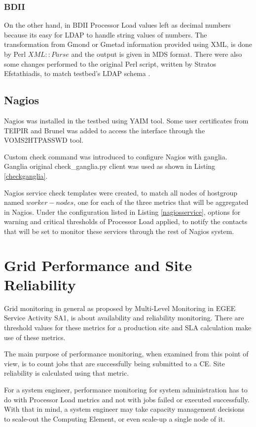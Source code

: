 \subsubsection{BDII}

On the other hand, in BDII Processor Load values left as decimal numbers because its easy for LDAP to handle string values of numbers. The transformation from Gmond or Gmetad information provided using XML, is done by Perl $XML::Parse$ and the output is given in MDS format. There were also some changes performed to the original Perl script, written by Stratos Efstathiadis, to match testbed's LDAP schema \cite{stratos_efstathiadis}.

\subsection{Nagios}

Nagios was installed in the testbed using \ac{YAIM} tool. Some user certificates from \ac{TEIPIR} and Brunel was added to access the interface through the VOMS2HTPASSWD tool.

Custom check command was introduced to configure Nagios with ganglia. Ganglia original check\_ganglia.py client was used as shown in Listing \ref{checkganglia}.

Nagios service check templates were created, to match all nodes of hostgroup named $worker-nodes$, one for each of the three metrics that will be aggregated in Nagios. Under the configuration listed in Listing \ref{nagiosservice}, options for warning and critical thresholds of Processor Load applied, to notify the contacts that will be set to monitor these services through the rest of Nagios system.

\section{Grid Performance and Site Reliability}

Grid monitoring in general as proposed by Multi-Level Monitoring in EGEE Service Activity SA1, is about availability and reliability monitoring. There are threshold values for these metrics for a production site and SLA calculation make use of these metrics.

The main purpose of performance monitoring, when examined from this point of view, is to count jobs that are successfully being submitted to a \ac{CE}. Site reliability is calculated using that metric.

For a system engineer, performance monitoring for system administration has to do with Processor Load metrics and not with jobs failed or executed successfully. With that in mind, a system engineer may take capacity management decisions to scale-out the Computing Element, or even scale-up a single node of it.

